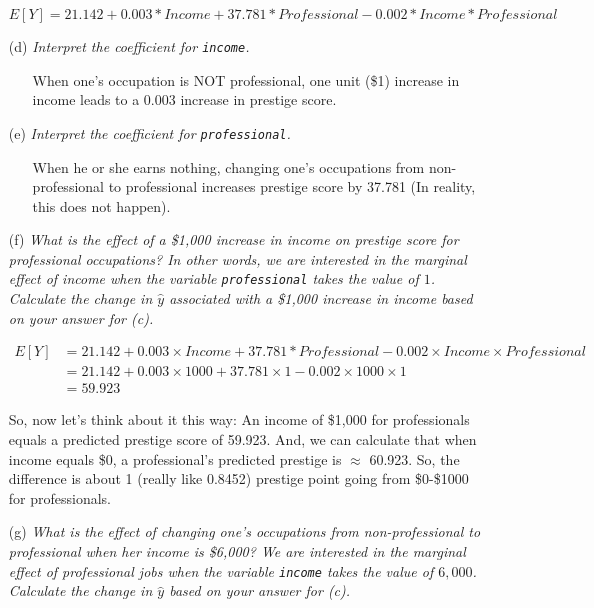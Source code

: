 \documentclass[12pt,letterpaper]{article}
\begin{document}
\begin{enumerate}
		$$E[Y]= 21.142 + 0.003*Income + 37.781*Professional - 0.002*Income* Professional$$
						\vspace{.25cm}
		\item [(d)]
		\textit{Interpret the coefficient for \texttt{income}.}
		\vspace{.5cm}
\begin{itemize}
	\item [] 		When one's occupation is NOT professional, one unit (\$1) increase in income leads to a 0.003 increase in prestige score. 
			\end{itemize}
		 		\vspace{1cm}
		\item [(e)] \textit{Interpret the coefficient for \texttt{professional}.}
				 		\vspace{.5cm}
		\begin{itemize}
			\item [] When he or she earns nothing, changing one's occupations from non-professional to professional increases prestige score by 37.781 (In reality, this does not happen).
		\end{itemize}
		 		\vspace{1cm}
		\item [(f)]
		\textit{What is the effect of a \$1,000 increase in income on prestige score for professional occupations? In other words, we are interested in the marginal effect of income when the variable \texttt{professional} takes the value of $1$. Calculate the change in $\hat{y}$ associated with a \$1,000 increase in income based on your answer for (c).}
		
		
		\begin{align*}
		E[Y] &= 21.142 + 0.003 \times Income + 37.781*Professional - 0.002 \times Income \times Professional \\
		&= 21.142 + 0.003 \times 1000 + 37.781 \times 1 - 0.002 \times 1000 \times 1 \\
		&= 59.923
		\end{align*}		 		\vspace{.25cm}
		
		So, now let's think about it this way: An income of \$1,000 for professionals equals a predicted prestige score of 59.923. And, we can calculate that when income equals \$0, a professional's predicted prestige is $\approx$ 60.923. So, the difference is about 1 (really like 0.8452) prestige point going from \$0-\$1000 for professionals.
		
\newpage
		\item [(g)]
		\textit{What is the effect of changing one's occupations from non-professional to professional when her income is \$6,000? We are interested in the marginal effect of professional jobs when the variable \texttt{income} takes the value of $6,000$. Calculate the change in $\hat{y}$ based on your answer for (c).}
		

\end{enumerate}
\end{document}
